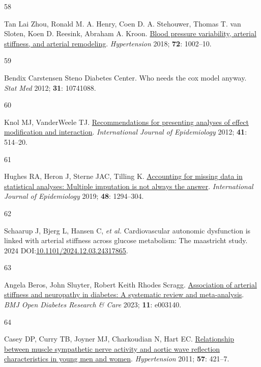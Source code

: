 \documentclass[
  a4paper,
  headsepline=true,
  open=any]{scrbook}
\newlength{\cslhangindent}
\newlength{\csllabelwidth}
\newlength{\cslentryspacingunit} %
\newenvironment{CSLReferences}[2] %
 {%
  \setlength{\parindent}{0pt}
  \ifodd #1
  \let\oldpar\par
  \def\par{\hangindent=\cslhangindent\oldpar}
  \fi
  \setlength{\parskip}{#2\cslentryspacingunit}
 }%
 {}
\newcommand{\CSLLeftMargin}[1]{\parbox[t]{\csllabelwidth}{#1}}
\newcommand{\CSLRightInline}[1]{\parbox[t]{\linewidth - \csllabelwidth}{#1}\break}
\begin{document}
\begin{CSLReferences}{0}{0}
\leavevmode{}%
\CSLLeftMargin{58 }%
\CSLRightInline{Tan Lai Zhou, Ronald M. A. Henry, Coen D. A. Stehouwer,
Thomas T. van Sloten, Koen D. Reesink, Abraham A. Kroon.
\href{https://doi.org/doi:10.1161/HYPERTENSIONAHA.118.11325}{Blood
pressure variability, arterial stiffness, and arterial remodeling}.
\emph{Hypertension} 2018; \textbf{72}: 1002--10.}

\leavevmode{}%
\CSLLeftMargin{59 }%
\CSLRightInline{Bendix Carstensen Steno Diabetes Center. Who needs the
cox model anyway. \emph{Stat Med} 2012; \textbf{31}: 10741088.}

\leavevmode{}%
\CSLLeftMargin{60 }%
\CSLRightInline{Knol MJ, VanderWeele TJ.
\href{https://doi.org/10.1093/ije/dyr218}{Recommendations for presenting
analyses of effect modification and interaction}. \emph{International
Journal of Epidemiology} 2012; \textbf{41}: 514--20.}

\leavevmode{}%
\CSLLeftMargin{61 }%
\CSLRightInline{Hughes RA, Heron J, Sterne JAC, Tilling K.
\href{https://doi.org/10.1093/ije/dyz032}{Accounting for missing data in
statistical analyses: Multiple imputation is not always the answer}.
\emph{International Journal of Epidemiology} 2019; \textbf{48}:
1294--304.}

\leavevmode{}%
\CSLLeftMargin{62 }%
\CSLRightInline{Schaarup J, Bjerg L, Hansen C, \emph{et al.}
Cardiovascular autonomic dysfunction is linked with arterial stiffness
across glucose metabolism: The maastricht study. 2024
DOI:\href{https://doi.org/10.1101/2024.12.03.24317865}{10.1101/2024.12.03.24317865}.}

\leavevmode{}%
\CSLLeftMargin{63 }%
\CSLRightInline{Angela Beros, John Sluyter, Robert Keith Rhodes Scragg.
\href{https://doi.org/10.1136/bmjdrc-2022-003140}{Association of
arterial stiffness and neuropathy in diabetes: A systematic review and
meta-analysis}. \emph{BMJ Open Diabetes Research \& Care} 2023;
\textbf{11}: e003140.}

\leavevmode{}%
\CSLLeftMargin{64 }%
\CSLRightInline{Casey DP, Curry TB, Joyner MJ, Charkoudian N, Hart EC.
\href{https://doi.org/10.1161/HYPERTENSIONAHA.110.164517}{Relationship
between muscle sympathetic nerve activity and aortic wave reflection
characteristics in young men and women}. \emph{Hypertension} 2011;
\textbf{57}: 421--7.}


\end{CSLReferences}
\end{document}
